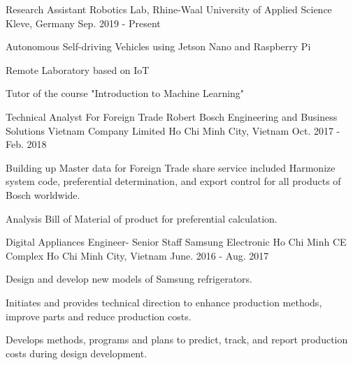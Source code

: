 

\begin{cventries}
  \cventry
    {Research Assistant} %
    {Robotics Lab, Rhine-Waal University of Applied Science} %
    {Kleve, Germany} %
    {Sep. 2019 - Present} %
    {
      \begin{cvitems} %
        \item {Autonomous Self-driving Vehicles using Jetson Nano and Raspberry Pi}
		\item {Remote Laboratory based on IoT}
        \item {Tutor of the course "Introduction to Machine Learning"}
      \end{cvitems}
    }
\bigskip

  \cventry
    {Technical Analyst For Foreign Trade} %
    {Robert Bosch Engineering and Business Solutions Vietnam Company Limited} %
    {Ho Chi Minh City, Vietnam} %
    {Oct. 2017 - Feb. 2018} %
    {
      \begin{cvitems} %
        \item {Building up Master data for Foreign Trade share service included Harmonize system code, preferential determination, and export control for all products of Bosch worldwide.}
        \item { Analysis Bill of Material of product for preferential calculation.}
      \end{cvitems}
    }
\bigskip

  \cventry
    {Digital Appliances Engineer- Senior Staff} %
    {Samsung Electronic Ho Chi Minh CE Complex} %
    {Ho Chi Minh City, Vietnam} %
    {June. 2016 - Aug. 2017} %
    {
      \begin{cvitems} %
        \item {Design and develop new models of Samsung refrigerators.}
        \item {Initiates and provides technical direction to enhance production methods, improve parts and reduce production costs.}
        \item {Develops methods, programs and plans to predict, track, and report production costs during design development.}
      \end{cvitems}
    }


\end{cventries}
